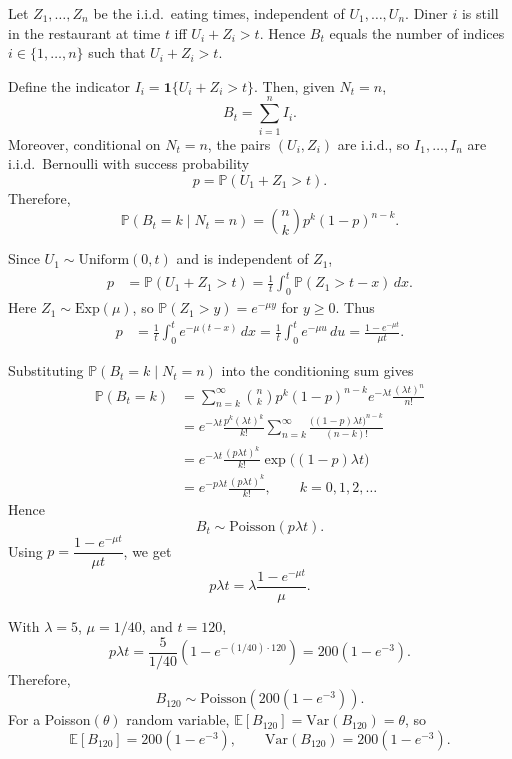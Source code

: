 \documentclass[hidelinks]{article}
\begin{document}
\smallskip

\noindent Let $Z_1,\dots,Z_n$ be the i.i.d.\ eating times, independent of $U_1,\dots,U_n$.
Diner $i$ is still in the restaurant at time $t$ iff $U_i+Z_i>t$. Hence $B_t$ equals the
number of indices $i\in\{1,\dots,n\}$ such that $U_i+Z_i>t$.

\smallskip

\noindent Define the indicator $I_i=\mathbf{1}\{U_i+Z_i>t\}$. Then, given $N_t=n$,
\[
B_t=\sum_{i=1}^n I_i.
\]
Moreover, conditional on $N_t=n$, the pairs $(U_i,Z_i)$ are i.i.d., so $I_1,\dots,I_n$ are
i.i.d.\ Bernoulli with success probability
\[
p=\mathbb{P}(U_1+Z_1>t).
\]
Therefore,
\[
\mathbb{P}(B_t=k\mid N_t=n)=\binom{n}{k}p^k(1-p)^{n-k}.
\]

\medskip
\noindent Since $U_1\sim \mathrm{Uniform}(0,t)$ and is independent of $Z_1$,
\begin{align*}
p
&=\mathbb{P}(U_1+Z_1>t)
=\frac{1}{t}\int_0^t \mathbb{P}(Z_1>t-x)\,dx.
\end{align*}
Here $Z_1\sim\mathrm{Exp}(\mu)$, so $\mathbb{P}(Z_1>y)=e^{-\mu y}$ for $y\ge 0$. Thus
\begin{align*}
p
&=\frac{1}{t}\int_0^t e^{-\mu(t-x)}\,dx
=\frac{1}{t}\int_0^t e^{-\mu u}\,du
=\frac{1-e^{-\mu t}}{\mu t}.
\end{align*}

\medskip
\noindent Substituting $\mathbb{P}(B_t=k\mid N_t=n)$ into the conditioning sum gives
\begin{align*}
\mathbb{P}(B_t=k)
&=\sum_{n=k}^{\infty}\binom{n}{k}p^k(1-p)^{n-k}e^{-\lambda t}\frac{(\lambda t)^n}{n!}\\
&=e^{-\lambda t}\frac{p^k(\lambda t)^k}{k!}
\sum_{n=k}^{\infty}\frac{\bigl((1-p)\lambda t\bigr)^{n-k}}{(n-k)!}\\
&=e^{-\lambda t}\frac{(p\lambda t)^k}{k!}\exp\!\bigl((1-p)\lambda t\bigr)\\
&=e^{-p\lambda t}\frac{(p\lambda t)^k}{k!},\qquad k=0,1,2,\dots
\end{align*}
Hence
\[
B_t\sim \mathrm{Poisson}(p\lambda t).
\]
Using $p=\dfrac{1-e^{-\mu t}}{\mu t}$, we get
\[
p\lambda t=\lambda\frac{1-e^{-\mu t}}{\mu}.
\]

\medskip
\noindent With $\lambda=5$, $\mu=1/40$, and $t=120$,
\[
p\lambda t=\frac{5}{1/40}\left(1-e^{-(1/40)\cdot 120}\right)=200(1-e^{-3}).
\]
Therefore,
\[
B_{120}\sim \mathrm{Poisson}\!\left(200(1-e^{-3})\right).
\]
For a Poisson$(\theta)$ random variable, $\mathbb{E}[B_{120}]=\mathrm{Var}(B_{120})=\theta$, so
\[
\mathbb{E}[B_{120}]=200(1-e^{-3}),
\qquad
\mathrm{Var}(B_{120})=200(1-e^{-3}).
\]
\end{document}
